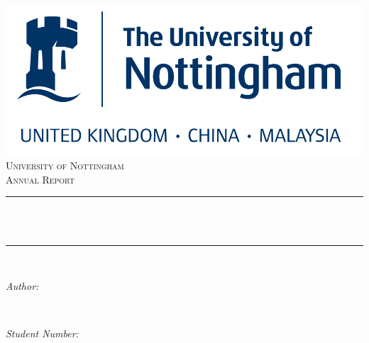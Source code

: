 \documentclass[12pt]{article}
\title{
}
\author{
}
\date{
}
\makeatletter
\let\thetitle\@title
\let\theauthor\@author
\let\thedate\@date
\makeatother
\begin{document}

\begin{titlepage}
	\centering
    \vspace*{0.3 cm}
    \includegraphics{uon.png}\\[0.9 cm]	%
    \textsc{\LARGE University of Nottingham}\\[2.0 cm]	%
	\textsc{\Large Annual Report}\\[0.5 cm]				%
	\rule{\linewidth}{0.2 mm} \\[0.4 cm]
	{ \huge \bfseries \thetitle}\\
	\rule{\linewidth}{0.2 mm} \\[1.5 cm]
	
	\begin{minipage}{0.4\textwidth}
		\begin{flushleft} \large
			\emph{Author:}\\
			\theauthor
			\end{flushleft}
			\end{minipage}~
			\begin{minipage}{0.4\textwidth}
			\begin{flushright} \large
			\emph{Student Number:} \\
		\end{flushright}
	\end{minipage}\\[2 cm]
	
	{\large \thedate}\\[2 cm]
 
	\vfill
	
\end{titlepage}


\tableofcontents
\pagebreak







\end{document}
